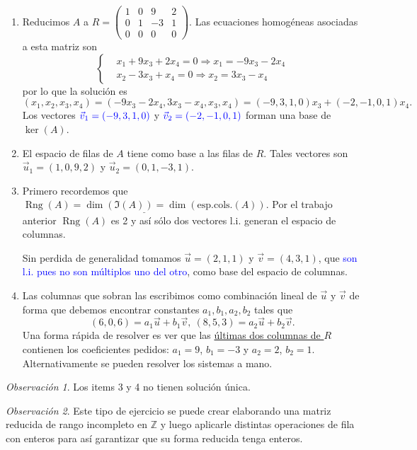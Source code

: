 \documentclass[12pt]{article}
\theoremstyle{plain}
\theoremstyle{definition}
\theoremstyle{remark}
\newtheorem*{Rmk}{Observación}      %
\DeclareMathOperator{\Rng}{Rng}     %
\newcommand{\bZ}{\mathbb{Z}}        %
\renewcommand{\:}{\colon}           %
\newcommand{\un}[1]{\underline{#1}}
\renewcommand{\.}{\Cdot}                %
\newcommand{\To}{\Rightarrow}
\newcommand{\blu}[1]{\textcolor{blue}{#1}}
\begin{document}
\begin{enumerate}
  \item Reducimos $A$ a $R=\begin{pmatrix}
    1&0&9&2\\0&1&-3&1\\0&0&0&0
  \end{pmatrix}$.
  Las ecuaciones homogéneas asociadas a esta matriz son 
  $$
  \left\lbrace\begin{aligned}
    &x_1+9x_3+2x_4=0\To x_1=-9x_3-2x_4\\
    &x_2-3x_3+x_4=0\To x_2=3x_3-x_4
  \end{aligned}\right.
  $$
  por lo que la solución es 
  $$(x_1,x_2,x_3,x_4)=(-9x_3-2x_4,3x_3-x_4,x_3,x_4)=(-9,3,1,0)x_3+(-2,-1,0,1)x_4.$$
  Los vectores $\blu{\vec{v}_1=(-9,3,1,0)}$ y $\blu{\vec{v}_2=(-2,-1,0,1)}$ forman una base de $\ker(A)$.
  \item El espacio de filas de $A$ tiene como base a las filas de $R$. Tales vectores son $\vec{u}_1=(1,0,9,2)$ y $\vec{u}_2=(0,1,-3,1)$.
  \item Primero recordemos que $\un{\Rng(A)=\dim(\Im(A))=\dim(\text{esp.cols.}(A))}$. Por el trabajo anterior $\Rng(A)$ es 2 y así sólo dos vectores l.i. generan el espacio de columnas.\par 
  Sin perdida de generalidad tomamos $\vec{u}=(2,1,1)$ y $\vec{v}=(4,3,1)$, que \blu{son l.i. pues no son múltiplos uno del otro}, como base del espacio de columnas.
  \item Las columnas que sobran las escribimos como combinación lineal de $\vec{u}$ y $\vec{v}$ de forma que debemos encontrar constantes $a_1,b_1,a_2,b_2$ tales que 
  $$(6,0,6)=a_1\vec{u}+b_1\vec{v},\ (8,5,3)=a_2\vec{u}+b_2\vec{v}.$$
  Una forma rápida de resolver es ver que las \un{últimas dos columnas de $R$} contienen los coeficientes pedidos: $a_1=9$, $b_1=-3$ y $a_2=2$, $b_2=1$. Alternativamente se pueden resolver los sistemas a mano. 
\end{enumerate}

\begin{Rmk}
  Los items 3 y 4 no tienen solución única. 
\end{Rmk}

\begin{Rmk}
  Este tipo de ejercicio se puede crear elaborando una matriz reducida de rango incompleto en $\bZ$ y luego aplicarle distintas operaciones de fila con enteros para así garantizar que su forma reducida tenga enteros.
\end{Rmk}
\end{document}
